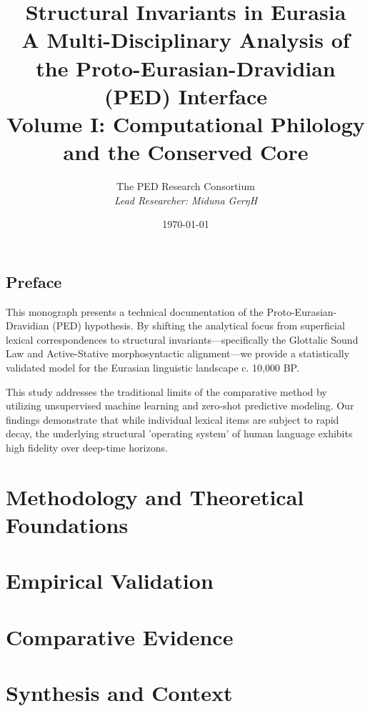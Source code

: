 \documentclass[11pt,oneside,openany]{book}
\title{\Huge \textbf{Structural Invariants in Eurasia} \\ \vspace{1cm} \Large A Multi-Disciplinary Analysis of the Proto-Eurasian-Dravidian (PED) Interface \\ \vspace{0.5cm} \large Volume I: Computational Philology and the Conserved Core}
\author{The PED Research Consortium \\ \textit{Lead Researcher: Miduna GerŋH}}
\date{\today}
\begin{document}
\maketitle

\chapter*{Preface}
This monograph presents a technical documentation of the Proto-Eurasian-Dravidian (PED) hypothesis. By shifting the analytical focus from superficial lexical correspondences to structural invariants—specifically the Glottalic Sound Law and Active-Stative morphosyntactic alignment—we provide a statistically validated model for the Eurasian linguistic landscape c. 10,000 BP. 

This study addresses the traditional limits of the comparative method by utilizing unsupervised machine learning and zero-shot predictive modeling. Our findings demonstrate that while individual lexical items are subject to rapid decay, the underlying structural 'operating system' of human language exhibits high fidelity over deep-time horizons.

\tableofcontents

\part{Methodology and Theoretical Foundations}






\part{Empirical Validation}




\part{Comparative Evidence}



\part{Synthesis and Context}



\appendix

\end{document}
